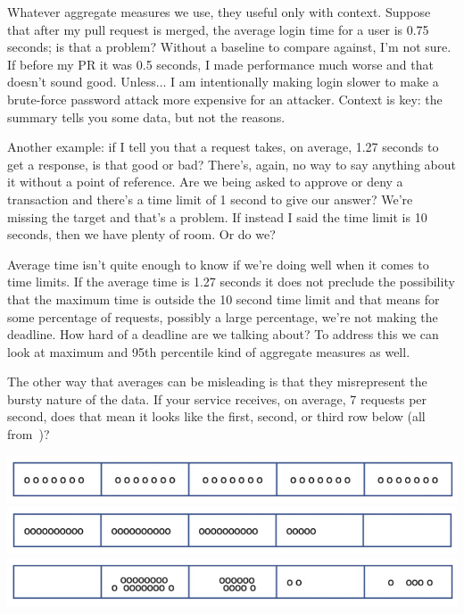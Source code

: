 Whatever aggregate measures we use, they useful only with context.  Suppose that after my pull request is merged, the average login time for a user is 0.75 seconds; is that a problem? Without a baseline to compare against, I'm not sure. If before my PR it was 0.5 seconds, I made performance much worse and that doesn't sound good. Unless... I am intentionally making login slower to make a brute-force password attack more expensive for an attacker. Context is key: the summary tells you some data, but not the reasons.

Another example: if I tell you that a request takes, on average, 1.27 seconds to get a response, is that good or bad? There's, again, no way to say anything about it without a point of reference. Are we being asked to approve or deny a transaction and there's a time limit of 1 second to give our answer? We're missing the target and that's a problem. If instead I said the time limit is 10 seconds, then we have plenty of room. Or do we?

Average time isn't quite enough to know if we're doing well when it comes to time limits. If the average time is 1.27 seconds it does not preclude the possibility that the maximum time is outside the 10 second time limit and that means for some percentage of requests, possibly a large percentage, we're not making the deadline. How hard of a deadline are we talking about? To address this we can look at maximum and 95th percentile kind of aggregate measures as well.

The other way that averages can be misleading is that they misrepresent the bursty nature of the data. If your service receives, on average, 7 requests per second, does that mean it looks like the first, second, or third row below (all from~\cite{usd})?

\begin{center}
	\includegraphics{images/burst1}\\
	\includegraphics{images/burst2}\\
	\includegraphics{images/burst3}\\
\end{center}

